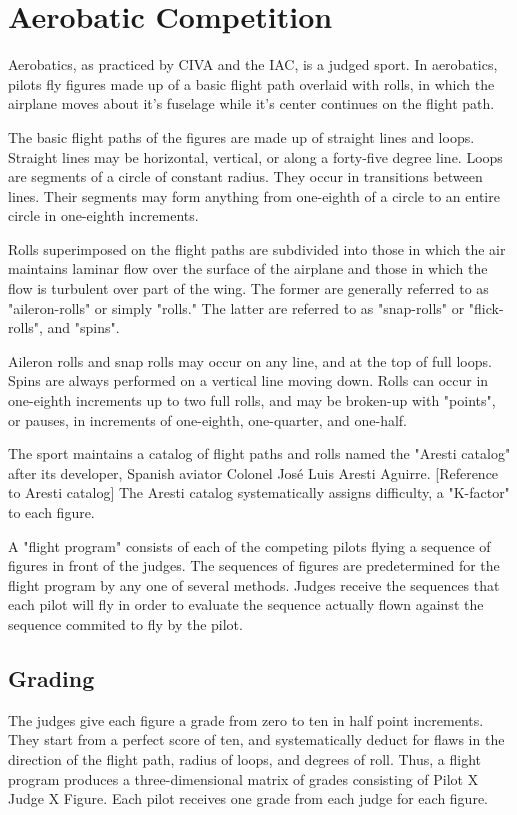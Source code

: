 \section{Aerobatic Competition}

Aerobatics, as practiced by CIVA and the IAC, is a judged sport.
In aerobatics, pilots fly figures made up of a basic flight path
overlaid with rolls, in which the airplane moves about it's fuselage
while it's center continues on the flight path.

The basic flight paths of the figures are made up of straight lines and
loops. Straight lines may be horizontal, vertical, or along a forty-five
degree line. Loops are segments of a circle of constant radius. They occur
in transitions between lines. Their segments may form anything from
one-eighth of a circle to an entire circle in one-eighth increments.

Rolls superimposed on the flight paths are subdivided into those in which
the air maintains laminar flow over the surface of the airplane and those
in which the flow is turbulent over part of the wing. The former are
generally referred to as "aileron-rolls" or simply "rolls." 
The latter are referred to as "snap-rolls" or "flick-rolls", and "spins".

Aileron rolls and snap rolls may occur on any line, and at the top of full loops.
Spins are always performed on a vertical line moving down.
Rolls can occur in one-eighth increments up to two full rolls, and may
be broken-up with "points", or pauses, in increments of one-eighth, one-quarter,
and one-half.

The sport maintains a catalog of flight paths and rolls named
the "Aresti catalog" after its developer,
Spanish aviator Colonel José Luis Aresti Aguirre. [Reference to Aresti catalog]
The Aresti catalog systematically assigns difficulty, a "K-factor" to each
figure.

A "flight program" consists of each of the competing pilots flying a sequence
of figures in front of the judges. The sequences of figures are predetermined
for the flight program by any one of several methods.
Judges receive the sequences that each pilot will fly in order to evaluate
the sequence actually flown against the sequence commited to fly by the pilot.

\subsection{Grading}

The judges give each figure a grade from zero to ten in half point increments.
They start from a perfect score of ten, and systematically deduct for flaws in
the direction of the flight path, radius of loops, and degrees of roll.  Thus,
a flight program produces a three-dimensional matrix of grades consisting of
Pilot X Judge X Figure.  Each pilot receives one grade from each judge for each
figure.


